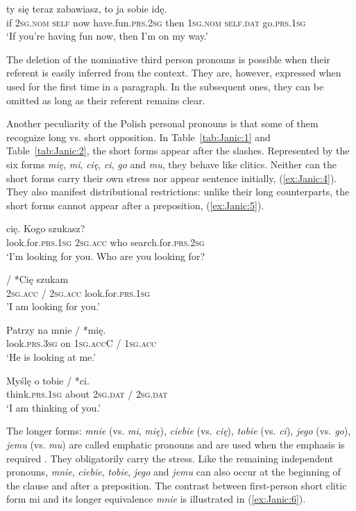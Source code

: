 \documentclass[output=paper]{langscibook}
\begin{document}
\ea
 \label{ex:Janic:3}
  {ty} {się}	{teraz}	{zabawiasz,} {to}	{ja} {sobie}		{idę.} \\
	 if		\textsc{2sg.nom}	\textsc{self}	now	have.fun.\textsc{prs.2sg}	then	\textsc{1sg.nom}	\textsc{self.dat}	go.\textsc{prs.1sg}\\
 	\glt‘If you’re having fun now, then I’m on my way.’
 \z
 

The deletion of the nominative third person pronouns is possible when their referent is easily inferred from the context. They are, however, expressed when used for the first time in a paragraph. In the subsequent ones, they can be omitted as long as their referent remains clear.

Another peculiarity of the Polish personal pronouns is that some of them recognize long vs. short opposition. In Table~\ref{tab:Janic:1} and Table~\ref{tab:Janic:2}, the short forms appear after the slashes. Represented by the six forms \textit{mię}, \textit{mi}, \textit{cię}, \textit{ci}, \textit{go} and \textit{mu}, they behave like clitics. Neither can the short forms carry their own stress nor appear sentence initially, (\ref{ex:Janic:4}). They also manifest distributional restrictions: unlike their long counterparts, the short forms cannot appear after a preposition, (\ref{ex:Janic:5}).

\ea \label{ex:Janic:4}
\ea \label{ex:Janic:4a}
  {cię.} {Kogo} {szukasz?}\\
 look.for.\textsc{prs.1sg}	\textsc{2sg.acc} who	search.for.\textsc{prs.2sg}\\
 \glt ‘I’m looking for you. Who are you looking for? \citep[155]{Swan2002}
 
\ex\label{ex:Janic:4b}
  {/} {*Cię} {szukam}\\	
	 \textsc{2sg.acc} / \textsc{2sg.acc}	look.for.\textsc{prs.1sg}\\
	\glt 'I am looking for you.’ 
\z
\z
 
\ea \label{ex:Janic:5}
\ea \label{ex:Janic:5a}
 \gll Patrzy		 na	mnie / *mię.\\
		look.\textsc{prs.3sg}	on	\textsc{1sg.accC} / \textsc{1sg.acc}\\
 \glt‘He is looking at me.’

\ex \label{ex:Janic:5b}
 \gll Myślę		 o	 tobie / *ci.\\
		 think.\textsc{prs.1sg}	about	\textsc{2sg.dat} / \textsc{2sg.dat}\\	
	\glt ‘I am thinking of you.’
\z
\z

The longer forms: \textit{mnie} (vs. \textit{mi}, \textit{mię}), \textit{ciebie} (vs. \textit{cię}), \textit{tobie} (vs. \textit{ci}), \textit{jego} (vs. \textit{go}), \textit{jemu} (vs. \textit{mu}) are called emphatic pronouns and are used when the emphasis is required \citep{Bielec1998}. They obligatorily carry the stress. Like the remaining independent pronouns, \textit{mnie}, \textit{ciebie}, \textit{tobie}, \textit{jego} and \textit{jemu} can also occur at the beginning of the clause and after a preposition. The contrast between first-person short clitic form mi and its longer equivalence \textit{mnie} is illustrated in (\ref{ex:Janic:6}).
\end{document}
